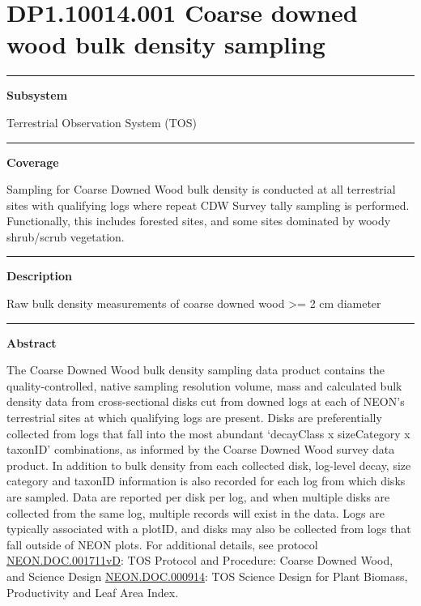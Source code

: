 \documentclass[]{article}
\begin{document}
\section{DP1.10014.001 Coarse downed wood bulk density
sampling}\label{dp1.10014.001-coarse-downed-wood-bulk-density-sampling}

\begin{center}\rule{0.5\linewidth}{\linethickness}\end{center}

\textbf{Subsystem}

Terrestrial Observation System (TOS)

\begin{center}\rule{0.5\linewidth}{\linethickness}\end{center}

\textbf{Coverage}

Sampling for Coarse Downed Wood bulk density is conducted at all
terrestrial sites with qualifying logs where repeat CDW Survey tally
sampling is performed. Functionally, this includes forested sites, and
some sites dominated by woody shrub/scrub vegetation.

\begin{center}\rule{0.5\linewidth}{\linethickness}\end{center}

\textbf{Description}

Raw bulk density measurements of coarse downed wood \textgreater{}= 2 cm
diameter

\begin{center}\rule{0.5\linewidth}{\linethickness}\end{center}

\textbf{Abstract}

The Coarse Downed Wood bulk density sampling data product contains the
quality-controlled, native sampling resolution volume, mass and
calculated bulk density data from cross-sectional disks cut from downed
logs at each of NEON's terrestrial sites at which qualifying logs are
present. Disks are preferentially collected from logs that fall into the
most abundant `decayClass x sizeCategory x taxonID' combinations, as
informed by the Coarse Downed Wood survey data product. In addition to
bulk density from each collected disk, log-level decay, size category
and taxonID information is also recorded for each log from which disks
are sampled. Data are reported per disk per log, and when multiple disks
are collected from the same log, multiple records will exist in the
data. Logs are typically associated with a plotID, and disks may also be
collected from logs that fall outside of NEON plots. For additional
details, see protocol
\href{http://data.neonscience.org/api/v0/documents/NEON.DOC.001711vD}{NEON.DOC.001711vD}:
TOS Protocol and Procedure: Coarse Downed Wood, and Science Design
\href{http://data.neonscience.org/api/v0/documents/NEON.DOC.000914vA}{NEON.DOC.000914}:
TOS Science Design for Plant Biomass, Productivity and Leaf Area Index.
\end{document}
